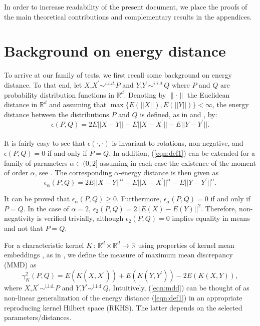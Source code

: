 \documentclass[11pt]{article}
\begin{document}
 
 In order to increase readability of the present document, we place the proofs of the main theoretical contributions and complementary results in the appendices.
 

\section{Background on energy  distance}
\label{sec:background}

To arrive at our  family of tests,  we first  recall some background on energy distance. To that end, let  $X$,$X^{\prime}\sim^{i.i.d. } P$ and $Y$,$Y^{\prime}\sim^{i.i.d.}Q$  where  
$P$ and  $Q$ are probability  distribution functions in $\mathbb{R}^{d}$. Denoting  by $\|\cdot\| $ the Euclidean distance in $\mathbb{R}^d$ and assuming that $\max\{E(||X||), E(||Y||)\}< \infty$, the  energy distance  between the distributions $P$ and $Q$ is defined, as in \cite{szekely2003statistics} and \cite{szekely2013energy},  by:
\begin{equation}
\label{eqn:def1}
\epsilon(P,Q)= 2E||X-Y||- E||X-X^{'}||-E||Y-Y^{'}||.
\end{equation}\\
It is fairly easy to see that  $\epsilon(\cdot, \cdot )$  is invariant to rotations, non-negative, and $\epsilon(P,Q)= 0$ if and only if $P=  Q$. In addition, 	
(\ref{eqn:def1}) can be extended for a family of parameters $\alpha\in(0,2]$ assuming in each case the existence of the moment of order $\alpha$, see \cite{szekely2013energy}. The corresponding  $\alpha$-energy distance is then given as
\begin{equation}
\label{eqn:def2}
\epsilon_\alpha(P,Q)= 2E||X-Y||^{\alpha}- E||X-X^{'}||^{\alpha}-E||Y-Y^{'}||^{\alpha}.
\end{equation}

It can be proved that $\epsilon_\alpha(P,Q)\geq 0$. Furthermore, $\epsilon_{\alpha}(P,Q)=0$ if and only if $P=Q$. In the case of $\alpha=2$, $\epsilon_2(P,Q)= 2||E(X)-E(Y)||^{2}$. Therefore, non-negativity is verified trivially, although 	$\epsilon_2(P,Q)=0$ implies equality in means and not that $P = Q$.

For  a  characteristic  kernel  $K \,:\, \mathbb{R}^{d} \times \mathbb{R}^{d}  \rightarrow \mathbb{R}$  using properties of kernel mean embeddings \cite{muandet2017kernel}, as in \cite{gretton2012kernel}, we define the  measure of maximum mean discrepancy (MMD) as 
\begin{equation}
	\label{eqn:mdd}
	\gamma_K^{2}(P,Q)= E(K(X,X^{'}))+E(K(Y,Y^{'}))-2E(K(X,Y)),
\end{equation}
	where $X$,$X^{\prime}\sim^{\text{i.i.d.}} P$ and $Y$,$Y^{\prime}\sim^{\text{i.i.d.}} Q$.  Intuitively, (\ref{eqn:mdd}) can be thought of  as  non-linear generalization of the energy distance (\ref{eqn:def1}) in an appropriate  reproducing  kernel Hilbert space (RKHS).  The latter  depends on the selected parameters/distances. 
	
\end{document}
